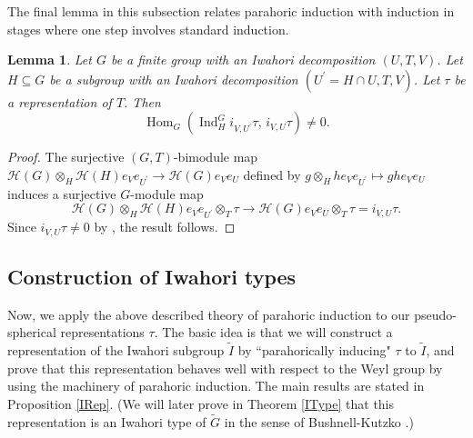 \documentclass[10pt, letterpaper]{amsart}
\theoremstyle{plain}
\newtheorem{Lem}[equation]{Lemma}
\theoremstyle{definition}
\numberwithin{equation}{section}
\newcommand{\Gt}{\widetilde{G}}
\newcommand{\It}{\widetilde{I}}
\newcommand{\Tt}{\widetilde{T}}
\newcommand{\Ind}{\operatorname{Ind}}
\newcommand{\Hom}{\operatorname{Hom}}
\newcommand{\Hcal}{\mathcal{H}}
\begin{document}
The final lemma in this subsection relates parahoric induction with induction in stages where one step involves standard induction.

\begin{Lem}\label{LHoms}
	Let $G$ be a finite group with an Iwahori decomposition $(U,T,V)$. Let $H\subseteq G$ be a subgroup with an Iwahori decomposition $(U^{\prime}=H\cap U,T,V)$. Let $\tau$ be a representation of $T$. Then
	\begin{equation*}
		\Hom_{G}(\Ind_{H}^{G}i_{V,U^{\prime}}\tau,\, i_{V,U}\tau)\neq 0.
	\end{equation*}
\end{Lem}

\begin{proof} The surjective $(G,T)$-bimodule map $\Hcal(G)\otimes_{H}\Hcal(H)e_{V}e_{U^{\prime}} \rightarrow \Hcal(G)e_{V}e_{U}$ defined by $g\otimes_{H} he_{V}e_{U^{\prime}}\mapsto gh e_{V}e_{U}$ induces a surjective $G$-module map 
	\begin{equation*}
		\Hcal(G)\otimes_{H}\Hcal(H)e_{V}e_{U^{\prime}}\otimes_{T}\tau \longrightarrow \Hcal(G)e_{V}e_{U}\otimes_{T}\tau=i_{V,U}\tau.
	\end{equation*}
	Since $i_{V,U}\tau\neq 0$ by \cite[Theorem 2.18 (6)]{CMO19}, the result follows.
\end{proof}







\subsection{Construction of Iwahori types}\label{IwahoriType}


Now, we apply the above described theory of parahoric induction to our pseudo-spherical representations $\tau$. The basic idea is that we will construct a representation of the Iwahori subgroup $\It$ by ``parahorically inducing" $\tau$ to $\It$, and prove that this representation behaves well with respect to the Weyl group by using the machinery of parahoric induction. The main results are stated in Proposition \ref{IRep}. (We will later prove in Theorem \ref{IType} that this representation is an Iwahori type of $\Gt$ in the sense of Bushnell-Kutzko \cite[(4.1) Definition]{BK98}.)
\end{document}
